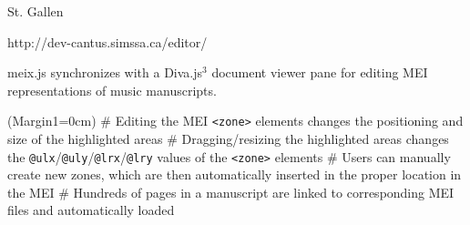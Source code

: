 \documentclass[final]{beamer}
\makeatletter
\newcommand{\blockSpace}{\vskip 0.75ex}
\newcommand*{\xml}[1]{\small{\texttt{<#1>}}\normalsize}
\newcommand*{\att}[1]{\small{\texttt{@#1}}\normalsize}
\makeatother
\begin{document}
\begin{frame}[fragile,t]
\begin{minipage}[t][.8\textheight]{\textwidth}
\begin{columns}
\begin{column}{0.95\textwidth}
\begin{block}{}
\begin{columns}
        \begin{column}{0.00cm}
        \end{column}

        \end{columns}
        \end{block}

        \begin{block}{}
        \vspace{-3cm}
        \begin{columns}
        \begin{column}{0.47\textwidth}
            \begin{block}{St. Gallen}
            \begin{center}
                \vspace{-0.75\baselineskip}
                \small{http://dev-cantus.simssa.ca/editor/}
                \normalsize
                \vspace{0.25\baselineskip}
            \end{center}

    \raggedright
    meix.js synchronizes with a Diva.js$^3$ document viewer pane for editing MEI representations of music manuscripts.
                
                \vspace{0.5\baselineskip}
                \begin{easylist}[itemize]
                \ListProperties(Margin1=0cm)
    # Editing the MEI \xml{zone} elements changes the positioning and size of the highlighted areas
    # Dragging/resizing the highlighted areas changes the \att{ulx}/\att{uly}/\att{lrx}/\att{lry} values of the \xml{zone} elements
    # Users can manually create new zones, which are then automatically inserted in the proper location in the MEI
    # Hundreds of pages in a manuscript are linked to corresponding MEI files and automatically loaded


\end{easylist}
\end{block}
\end{column}
\end{columns}
\end{block}
\end{column}
\end{columns}
\end{minipage}
\end{frame}
\end{document}
